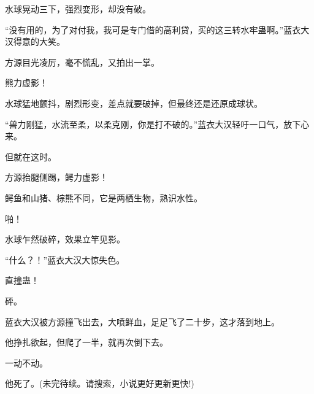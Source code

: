 \begin{this_body}
水球晃动三下，强烈变形，却没有破。

“没有用的，为了对付我，我可是专门借的高利贷，买的这三转水牢蛊啊。”蓝衣大汉得意的大笑。

方源目光凌厉，毫不慌乱，又拍出一掌。

熊力虚影！

水球猛地颤抖，剧烈形变，差点就要破掉，但最终还是还原成球状。

“兽力刚猛，水流至柔，以柔克刚，你是打不破的。”蓝衣大汉轻吁一口气，放下心来。

但就在这时。

方源抬腿侧踢，鳄力虚影！

鳄鱼和山猪、棕熊不同，它是两栖生物，熟识水性。

啪！

水球乍然破碎，效果立竿见影。

“什么？！”蓝衣大汉大惊失色。

直撞蛊！

砰。

蓝衣大汉被方源撞飞出去，大喷鲜血，足足飞了二十步，这才落到地上。

他挣扎欲起，但爬了一半，就再次倒下去。

一动不动。

他死了。(未完待续。请搜索，小说更好更新更快!)

\end{this_body}

